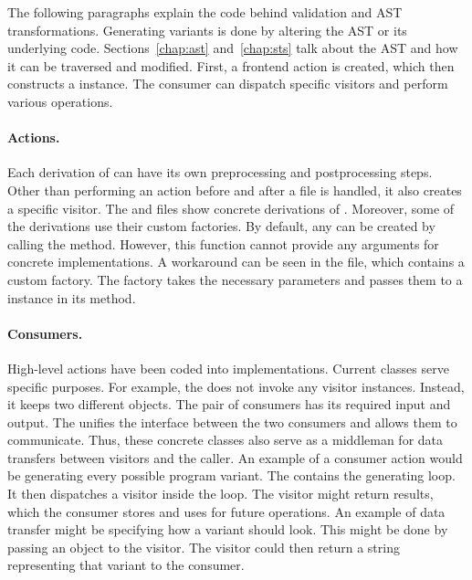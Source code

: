 The following paragraphs explain the code behind validation and AST 
transformations.
Generating variants is done by altering the AST or its underlying code.
Sections~\ref{chap:ast} and~\ref{chap:sts} talk about the AST and how it can 
be traversed and modified.
First, a frontend action is created, which then constructs a  
instance.
The consumer can dispatch specific visitors and perform various operations.

\paragraph{Actions.} Each derivation of  can have 
its own preprocessing and postprocessing steps.
Other than performing an action before and after a file is handled, it also 
creates a specific visitor.
The  and  files show concrete derivations 
of .
Moreover, some of the derivations use their custom factories.
By default, any  can be created by calling 
the  method.
However, this function cannot provide any arguments for concrete 
 implementations.
A workaround can be seen in the  file, which contains 
a custom factory.
The factory takes the necessary parameters and passes them to 
a  instance in its  method.

\paragraph{Consumers.} High-level actions have been coded into 
 implementations.
Current  classes serve specific purposes.
For example, the   
does not invoke any visitor instances.
Instead, it keeps two different  objects.
The pair of consumers has its required input and output.
The  unifies the interface between the two 
consumers and allows them to communicate.
Thus, these concrete  classes also serve as a middleman for 
data transfers between visitors and the caller.
An example of a consumer action would be generating every possible program 
variant.
The  contains the generating loop.
It then dispatches a visitor inside the loop.
The visitor might return results, which the consumer stores and uses for 
future operations.
An example of data transfer might be specifying how a variant should look.
This might be done by passing an object to the visitor.
The visitor could then return a string representing that variant to 
the consumer.

